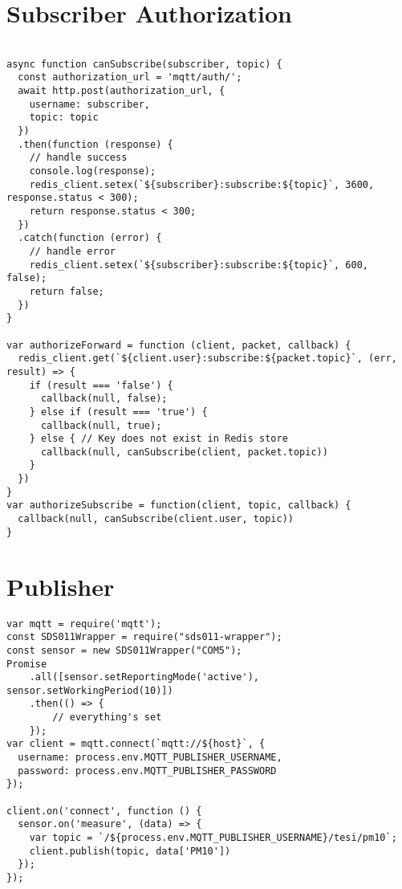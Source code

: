 \section{Subscriber Authorization}
\begin{footnotesize}
\begin{verbatim}

async function canSubscribe(subscriber, topic) {
  const authorization_url = 'mqtt/auth/';
  await http.post(authorization_url, {
    username: subscriber,
    topic: topic
  })
  .then(function (response) {
    // handle success
    console.log(response);
    redis_client.setex(`${subscriber}:subscribe:${topic}`, 3600, response.status < 300);
    return response.status < 300;
  })
  .catch(function (error) {
    // handle error
    redis_client.setex(`${subscriber}:subscribe:${topic}`, 600, false);
    return false;
  })
}

var authorizeForward = function (client, packet, callback) {
  redis_client.get(`${client.user}:subscribe:${packet.topic}`, (err, result) => { 
    if (result === 'false') {
      callback(null, false);
    } else if (result === 'true') {
      callback(null, true);
    } else { // Key does not exist in Redis store
      callback(null, canSubscribe(client, packet.topic))
    }
  })
}
var authorizeSubscribe = function(client, topic, callback) {
  callback(null, canSubscribe(client.user, topic))
}
\end{verbatim}
\end{footnotesize}

\newpage
\section{Publisher}
\begin{footnotesize}
\begin{verbatim}
var mqtt = require('mqtt');
const SDS011Wrapper = require("sds011-wrapper");
const sensor = new SDS011Wrapper("COM5");
Promise
    .all([sensor.setReportingMode('active'), sensor.setWorkingPeriod(10)])
    .then(() => {
        // everything's set
    });
var client = mqtt.connect(`mqtt://${host}`, {
  username: process.env.MQTT_PUBLISHER_USERNAME,
  password: process.env.MQTT_PUBLISHER_PASSWORD
});

client.on('connect', function () {
  sensor.on('measure', (data) => {
    var topic = `/${process.env.MQTT_PUBLISHER_USERNAME}/tesi/pm10`;
    client.publish(topic, data['PM10'])
  });
});
\end{verbatim}
\end{footnotesize}


